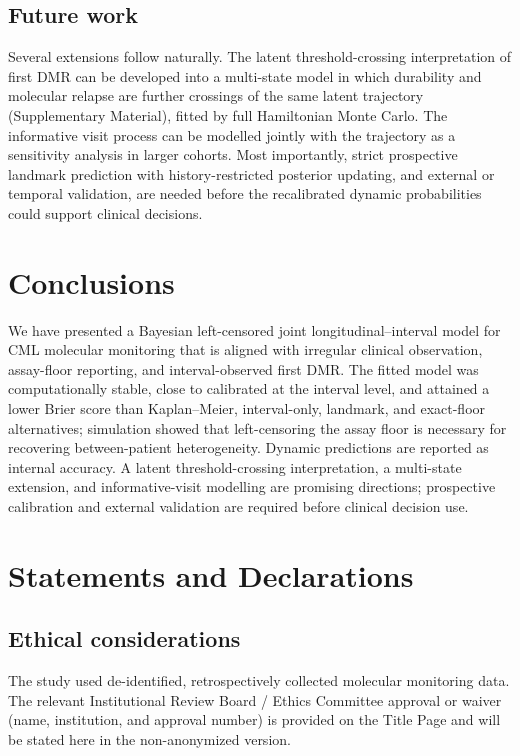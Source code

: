 \documentclass[11pt]{article}
\begin{document}
\subsection{Future work}

Several extensions follow naturally. The latent threshold-crossing
interpretation of first DMR can be developed into a multi-state model in
which durability and molecular relapse are further crossings of the same
latent trajectory (Supplementary Material), fitted by full Hamiltonian Monte
Carlo. The informative visit process can be modelled jointly with the
trajectory as a sensitivity analysis in larger cohorts. Most importantly,
strict prospective landmark prediction with history-restricted posterior
updating, and external or temporal validation, are needed before the
recalibrated dynamic probabilities could support clinical decisions.

\section{Conclusions}

We have presented a Bayesian left-censored joint longitudinal--interval
model for CML molecular monitoring that is aligned with irregular clinical
observation, assay-floor reporting, and interval-observed first DMR. The
fitted model was computationally stable, close to calibrated at the interval
level, and attained a lower Brier score than Kaplan--Meier, interval-only,
landmark, and exact-floor alternatives; simulation showed that left-censoring
the assay floor is necessary for recovering between-patient heterogeneity.
Dynamic predictions are reported as internal accuracy. A latent
threshold-crossing interpretation, a multi-state extension, and
informative-visit modelling are promising directions; prospective
calibration and external validation are required before clinical decision
use.

\section*{Statements and Declarations}

\subsection*{Ethical considerations}
The study used de-identified, retrospectively collected molecular
monitoring data. The relevant Institutional Review Board / Ethics
Committee approval or waiver (name, institution, and approval number) is
provided on the Title Page and will be stated here in the non-anonymized
version.
\end{document}
